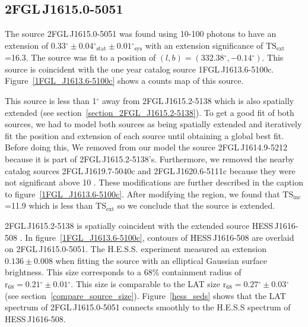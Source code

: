 \documentclass[12pt,preprint]{aastex}
\newcommand{\gev}{\text{GeV}\xspace}
\newcommand{\tev}{\text{TeV}\xspace}
\newcommand{\tsext}{{\ensuremath{\text{TS}_{\text{ext}}}}\xspace}
\newcommand{\tsinc}{\ensuremath{\text{TS}_{\text{inc}}}\xspace}
\newcommand{\rsixeight}{{\ensuremath{\text{r}_{68}}}\xspace}
\newcommand{\sys}{\text{sys}\xspace}
\newcommand{\stat}{\text{stat}\xspace}
\renewcommand{\deg}{\ensuremath{^\circ}\xspace}
\begin{document}
\subsection{2FGL\,J1615.0-5051}
\label{section_2FGL_J1615.0-5051}


The source 2FGL\,J1615.0-5051 was found using 10-100 \tev
photons to have an extension of $0.33\deg\pm0.04\deg_\stat\pm0.01\deg_\sys$
with an extension significance of \tsext=16.3.  The source
was fit to a position of $(l,b)=(332.38\deg,-0.14\deg)$.
This source is coincident with the one year catalog source
1FGL\,J1613.6-5100c. Figure~\ref{1FGL_J1613.6-5100c} shows a counts map
of this source.

This source is less than 1\deg away from 2FGL\,J1615.2-5138 which is
also spatially extended (see section~\ref{section_2FGL_J1615.2-5138}).
To get a good fit of both sources, we had to model both sources as
being spatially extended and iteratively fit the position and extension
of each source until obtaining a global best fit.  Before doing this,
We removed from our model the source 2FGL\,J1614.9-5212 because it is
part of 2FGL\,J1615.2-5138's. Furthermore, we removed the nearby catalog
sources 2FGL\,J1619.7-5040c and 2FGL\,J1620.6-5111c because they were not
significant above 10 \gev.  These modifications are further described
in the caption to figure~\ref{1FGL_J1613.6-5100c}.  After modifying
the region, we found that \tsinc=11.9 which is less than \tsext so we
conclude that the source is extended.

2FGL\,J1615.2-5138 is spatially coincident with the extended
\tev source HESS\,J1616-508 \citep{hess_plane_survey}.  In
figure~\ref{1FGL_J1613.6-5100c}, contours of HESS\,J1616-508 are overlaid
on 2FGL\,J1615.0-5051.  The H.E.S.S. experiment measured an
extension $0.136\pm 0.008$ when fitting the source with an elliptical
Gaussian surface brightness.  This size corresponds to a 68\% containment
radius of $\rsixeight=0.21\deg\pm0.01\deg$. This size is comparable to the LAT
size $\rsixeight=0.27\deg\pm0.03\deg$ (see section~\ref{compare_source_size}).
Figure~\ref{hess_seds} shows that the LAT spectrum of 2FGL\,J1615.0-5051
connects smoothly to the H.E.S.S spectrum of HESS\,J1616-508.
\end{document}
